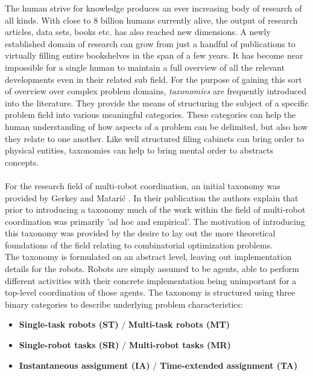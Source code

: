 The human strive for knowledge produces an ever increasing body of research of all kinds. With close to 8 billion humans currently alive, the output of research articles, data sets, books etc. has also reached new dimensions. A newly established domain of research can grow from just a handful of publications to virtually filling entire bookshelves in the span of a few years. It has become near impossible for a single human to maintain a full overview of all the relevant developments even in their related sub field. For the purpose of gaining this sort of overview over complex problem domains, \textit{taxonomies} are frequently introduced into the literature. They provide the means of structuring the subject of a specific problem field into various meaningful categories. These categories can help the human understanding of how aspects of a problem can be delimited, but also how they relate to one another. Like well structured filing cabinets can bring order to physical entities, taxonomies can help to bring mental order to abstracts concepts.\\ \\
%
For the research field of multi-robot coordination, an initial taxonomy was provided by Gerkey and Matarić \cite{gerkey_formal_2016}. In their publication the authors explain that prior to introducing a taxonomy much of the work within the field of multi-robot coordination was primarily 'ad hoc and empirical'. The motivation of introducing this taxonomy was provided by the desire to lay out the more theoretical foundations of the field relating to combinatorial optimization problems.\\
The taxonomy is formulated on an abstract level, leaving out implementation details for the robots. Robots are simply assumed to be agents, able to perform different activities with their concrete implementation being unimportant for a top-level coordination of those agents. The taxonomy is structured using three binary categories to describe underlying problem characteristics:
\begin{itemize}
\item \textbf{Single-task robots (ST)} / \textbf{Multi-task robots (MT)}
\item \textbf{Single-robot tasks (SR)} / \textbf{Multi-robot tasks (MR)}
\item \textbf{Instantaneous assignment (IA)} / \textbf{Time-extended assignment (TA)}
\end{itemize}
